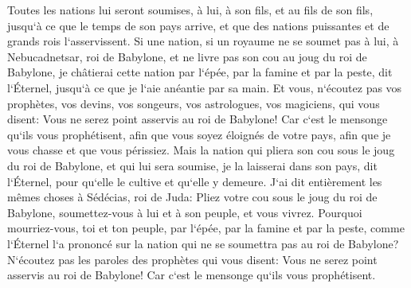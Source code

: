 \verse Toutes les nations lui seront soumises, à lui, à son fils, et au fils de son fils, jusqu`à ce que le temps de son pays arrive, et que des nations puissantes et de grands rois l`asservissent. 
\verse Si une nation, si un royaume ne se soumet pas à lui, à Nebucadnetsar, roi de Babylone, et ne livre pas son cou au joug du roi de Babylone, je châtierai cette nation par l`épée, par la famine et par la peste, dit l`Éternel, jusqu`à ce que je l`aie anéantie par sa main. 
\verse Et vous, n`écoutez pas vos prophètes, vos devins, vos songeurs, vos astrologues, vos magiciens, qui vous disent: Vous ne serez point asservis au roi de Babylone! 
\verse Car c`est le mensonge qu`ils vous prophétisent, afin que vous soyez éloignés de votre pays, afin que je vous chasse et que vous périssiez. 
\verse Mais la nation qui pliera son cou sous le joug du roi de Babylone, et qui lui sera soumise, je la laisserai dans son pays, dit l`Éternel, pour qu`elle le cultive et qu`elle y demeure. 
\verse J`ai dit entièrement les mêmes choses à Sédécias, roi de Juda: Pliez votre cou sous le joug du roi de Babylone, soumettez-vous à lui et à son peuple, et vous vivrez. 
\verse Pourquoi mourriez-vous, toi et ton peuple, par l`épée, par la famine et par la peste, comme l`Éternel l`a prononcé sur la nation qui ne se soumettra pas au roi de Babylone? 
\verse N`écoutez pas les paroles des prophètes qui vous disent: Vous ne serez point asservis au roi de Babylone! Car c`est le mensonge qu`ils vous prophétisent. 
